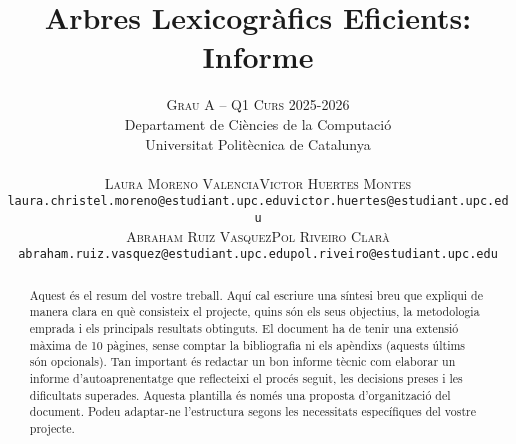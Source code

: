 \documentclass[a4paper]{article}
\title{\textbf{Arbres Lexicogràfics Eficients: Informe}}
\author{
\large
\textsc{Grau A -- Q1 Curs 2025-2026}\\[2mm] 
\normalsize Departament de Ciències de la Computació \\
\normalsize Universitat Politècnica de Catalunya \\[1cm]
%
\begin{tabular}{cc}
{\textsc{Laura Moreno Valencia}} & {\textsc{Victor Huertes Montes}} \\
\normalsize \texttt{laura.christel.moreno@estudiant.upc.edu} & \normalsize \texttt{victor.huertes@estudiant.upc.edu} \\[4mm]
{\textsc{Abraham Ruiz Vasquez}} & {\textsc{Pol Riveiro Clarà}} \\
\normalsize \texttt{abraham.ruiz.vasquez@estudiant.upc.edu} & \normalsize \texttt{pol.riveiro@estudiant.upc.edu} \\
\end{tabular}
}
\date{}
\begin{document}
\maketitle

\begin{abstract}
Aquest és el resum del vostre treball. Aquí cal escriure una síntesi breu que expliqui de manera clara en què consisteix el projecte, quins són els seus objectius, la metodologia emprada i els principals resultats obtinguts.
El document ha de tenir una extensió màxima de 10 pàgines, sense comptar la bibliografia ni els apèndixs (aquests últims són opcionals). Tan important és redactar un bon informe tècnic com elaborar un informe d’autoaprenentatge que reflecteixi el procés seguit, les decisions preses i les dificultats superades.
Aquesta plantilla és només una proposta d’organització del document. Podeu adaptar-ne l’estructura segons les necessitats específiques del vostre projecte.
\end{abstract}

 \newpage
 \newpage
 \newpage
\end{document}
